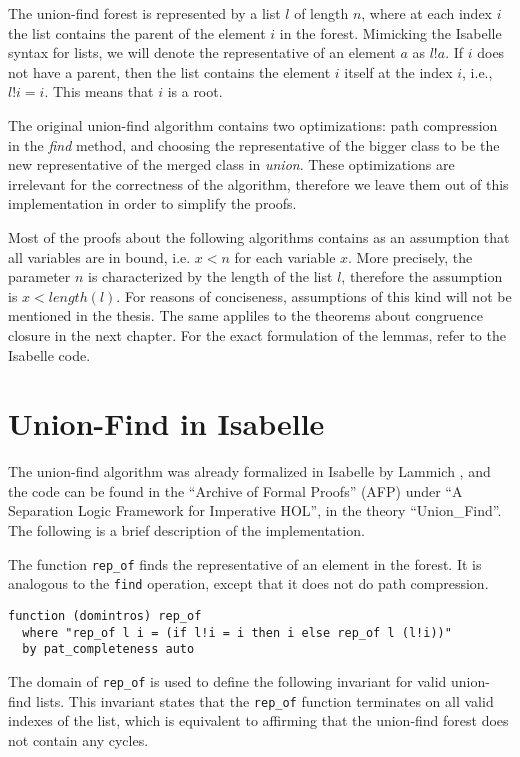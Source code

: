 The union-find forest is represented by a list $l$ of length $n$, where at each index $i$ the list contains the parent of the element $i$ in the forest.
Mimicking the Isabelle syntax for lists, we will denote the representative of an element $a$ as $l ! a$.
If $i$ does not have a parent, then the list contains the element $i$ itself at the index $i$, i.e., $l!i = i$. This means that $i$ is a root.

The original union-find algorithm \cite{Tarjan} contains two optimizations: path compression in the \emph{find} method, and choosing the representative of the bigger class to be the new representative of the merged class in \emph{union}. These optimizations are irrelevant for the correctness of the algorithm, therefore we leave them out of this implementation in order to simplify the proofs.

Most of the proofs about the following algorithms contains as an assumption that all variables are in bound, i.e. $x < n$ for each variable $x$.
More precisely, the parameter $n$ is characterized by the length of the list $l$, therefore the assumption is $x < length(l)$.
For reasons of conciseness, assumptions of this kind will not be mentioned in the thesis. The same appliles to the theorems about congruence closure in the next chapter.
For the exact formulation of the lemmas, refer to the Isabelle code.

\section{Union-Find in Isabelle}
\label{section:uf-isabelle}

The union-find algorithm was already formalized in Isabelle by Lammich \cite{unionfind-isabelle}, and the code can be found in the ``Archive of Formal Proofs'' (AFP) under ``A Separation Logic Framework for Imperative HOL'', in the theory ``Union\_Find''\cite{afp, Sep}. The following is a brief description of the implementation.

The function \lstinline{rep_of} finds the representative of an element in the forest. It is analogous to the \lstinline{find} operation, except that it does not do path compression.

\begin{lstlisting}
function (domintros) rep_of
  where "rep_of l i = (if l!i = i then i else rep_of l (l!i))"
  by pat_completeness auto
\end{lstlisting}

The domain of \lstinline{rep_of} is used to define the following invariant for valid union-find lists. This invariant states that the \lstinline{rep_of} function terminates on all valid indexes of the list, which is equivalent to affirming that the union-find forest does not contain any cycles.

